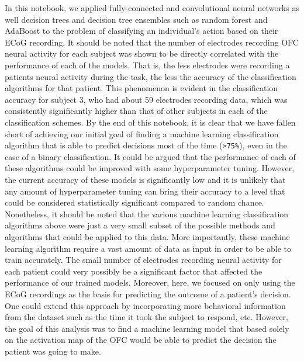\documentclass[11pt]{article}
\begin{document}
    In this notebook, we applied fully-connected and convolutional neural
networks as well decision trees and decision tree ensembles such as
random forest and AdaBoost to the problem of classifying an individual's
action based on their ECoG recording. It should be noted that the number
of electrodes recording OFC neural activity for each subject was shown
to be directly correlated with the performance of each of the models.
That is, the less electrodes were recording a patients neural activity
during the task, the less the accuracy of the classification algorithms
for that patient. This phenomenon is evident in the classification
accuracy for subject 3, who had about 59 electrodes recording data,
which was consistently significantly higher than that of other subjects
in each of the classification schemes. By the end of this notebook, it
is clear that we have fallen short of achieving our initial goal of
finding a machine learning classification algorithm that is able to
predict decisions most of the time (\texttt{\textgreater{}75\%}), even
in the case of a binary classification. It could be argued that the
performance of each of these algorithms could be improved with some
hyperparameter tuning. However, the current accuracy of these models is
significantly low and it is unlikely that any amount of hyperparameter
tuning can bring their accuracy to a level that could be considered
statistically significant compared to random chance. Nonetheless, it
should be noted that the various machine learning classification
algorithms above were just a very small subset of the possible methods
and algorithms that could be applied to this data. More importantly,
these machine learning algorithm require a vast amount of data as input
in order to be able to train accurately. The small number of electrodes
recording neural activity for each patient could very possibly be a
significant factor that affected the performance of our trained models.
Moreover, here, we focused on only using the ECoG recordings as the
basis for predicting the outcome of a patient's decision. One could
extend this approach by incorporating more behavioral information from
the dataset such as the time it took the subject to respond, etc.
However, the goal of this analysis was to find a machine learning model
that based solely on the activation map of the OFC would be able to
predict the decision the patient was going to make.
\end{document}
